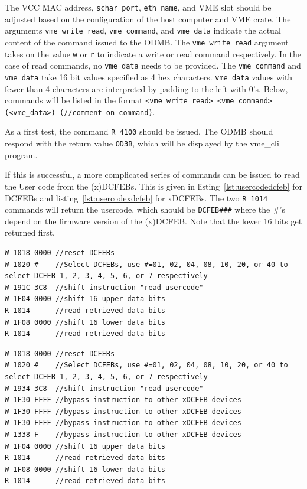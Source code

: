 \documentclass[10pt,a4paper]{article}
\begin{document}
The VCC MAC address, \texttt{schar\_port}, \texttt{eth\_name}, and VME slot should be adjusted based on the configuration of the host computer and VME crate. The arguments \texttt{vme\_write\_read}, \texttt{vme\_command}, and \texttt{vme\_data} indicate the actual content of the command issued to the ODMB. The \texttt{vme\_write\_read} argument takes on the value \texttt{w} or \texttt{r} to indicate a write or read command respectively. In the case of read commands, no \texttt{vme\_data} needs to be provided. The \texttt{vme\_command} and \texttt{vme\_data} take 16 bit values specified as 4 hex characters. \texttt{vme\_data} values with fewer than 4 characters are interpreted by padding to the left with 0's. Below, commands will be listed in the format \texttt{<vme\_write\_read> <vme\_command> (<vme\_data>) (//comment on command)}.

As a first test, the command \texttt{R 4100} should be issued. The ODMB should respond with the return value \texttt{OD3B}, which will be displayed by the vme\_cli program.

If this is successful, a more complicated series of commands can be issued to read the User code from the (x)DCFEBs. This is given in listing~\ref{lst:usercodedcfeb} for DCFEBs and listing~\ref{lst:usercodexdcfeb} for xDCFEBs. The two \texttt{R 1014} commands will return the usercode, which should be \texttt{DCFEB\#\#\#} where the \#'s depend on the firmware version of the (x)DCFEB. Note that the lower 16 bits get returned first.

\begin{lstlisting}[label={lst:usercodedcfeb}]
W 1018 0000 //reset DCFEBs
W 1020 #    //Select DCFEBs, use #=01, 02, 04, 08, 10, 20, or 40 to select DCFEB 1, 2, 3, 4, 5, 6, or 7 respectively
W 191C 3C8  //shift instruction "read usercode"
W 1F04 0000 //shift 16 upper data bits
R 1014      //read retrieved data bits
W 1F08 0000 //shift 16 lower data bits
R 1014      //read retrieved data bits
\end{lstlisting}

\begin{lstlisting}[label={lst:usercodexdcfeb}]
W 1018 0000 //reset DCFEBs
W 1020 #    //Select DCFEBs, use #=01, 02, 04, 08, 10, 20, or 40 to select DCFEB 1, 2, 3, 4, 5, 6, or 7 respectively
W 1934 3C8  //shift instruction "read usercode"
W 1F30 FFFF //bypass instruction to other xDCFEB devices
W 1F30 FFFF //bypass instruction to other xDCFEB devices
W 1F30 FFFF //bypass instruction to other xDCFEB devices
W 1338 F    //bypass instruction to other xDCFEB devices
W 1F04 0000 //shift 16 upper data bits
R 1014      //read retrieved data bits
W 1F08 0000 //shift 16 lower data bits
R 1014      //read retrieved data bits
\end{lstlisting}
\end{document}

